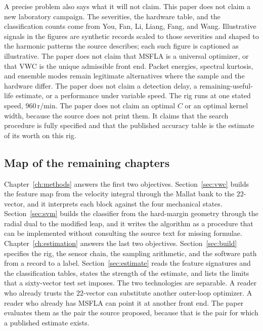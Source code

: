 A precise problem also says what it will not claim.
This paper does not claim a new laboratory campaign.
The severities, the hardware table, and the classification counts come from You, Fan, Li, Liang, Fang, and Wang.
Illustrative signals in the figures are synthetic records scaled to those severities and shaped to the harmonic patterns the source describes; each such figure is captioned as illustrative.
The paper does not claim that MSFLA is a universal optimizer, or that VWC is the unique admissible front end.
Packet energies, spectral kurtosis, and ensemble modes remain legitimate alternatives where the sample and the hardware differ.
The paper does not claim a detection delay, a remaining-useful-life estimate, or a performance under variable speed.
The rig runs at one stated speed, \(960\,\mathrm{r/min}\).
The paper does not claim an optimal \(C\) or an optimal kernel width, because the source does not print them.
It claims that the search procedure is fully specified and that the published accuracy table is the estimate of its worth on this rig.

\subsection{Map of the remaining chapters}

Chapter~\ref{ch:methods} answers the first two objectives.
Section~\ref{sec:vwc} builds the feature map from the velocity integral through the Mallat bank to the \(22\)-vector, and it interprets each block against the four mechanical states.
Section~\ref{sec:svm} builds the classifier from the hard-margin geometry through the radial dual to the modified leap, and it writes the algorithm as a procedure that can be implemented without consulting the source text for missing formulae.
Chapter~\ref{ch:estimation} answers the last two objectives.
Section~\ref{sec:build} specifies the rig, the sensor chain, the sampling arithmetic, and the software path from a record to a label.
Section~\ref{sec:estimate} reads the feature signatures and the classification tables, states the strength of the estimate, and lists the limits that a sixty-vector test set imposes.
The two technologies are separable.
A reader who already trusts the \(22\)-vector can substitute another outer-loop optimizer.
A reader who already has MSFLA can point it at another front end.
The paper evaluates them as the pair the source proposed, because that is the pair for which a published estimate exists.

